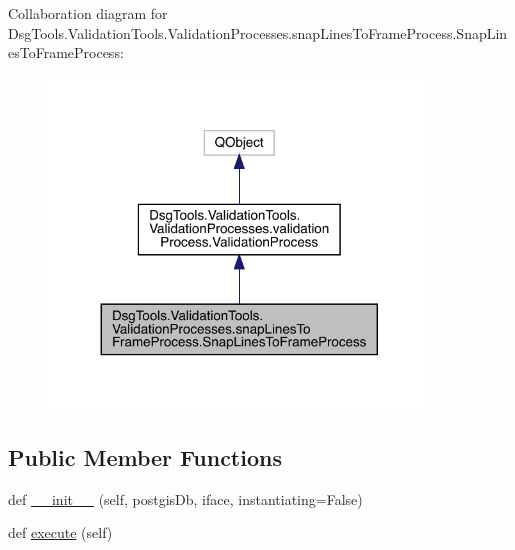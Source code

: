 Collaboration diagram for Dsg\+Tools.\+Validation\+Tools.\+Validation\+Processes.\+snap\+Lines\+To\+Frame\+Process.\+Snap\+Lines\+To\+Frame\+Process\+:
\nopagebreak
\begin{figure}[H]
\begin{center}
\leavevmode
\includegraphics[width=287pt]{class_dsg_tools_1_1_validation_tools_1_1_validation_processes_1_1snap_lines_to_frame_process_1_1ba1654e13ea79a845ddc225e5795362e}
\end{center}
\end{figure}
\subsection*{Public Member Functions}
\begin{DoxyCompactItemize}
\item 
def \mbox{\hyperlink{class_dsg_tools_1_1_validation_tools_1_1_validation_processes_1_1snap_lines_to_frame_process_1_1_snap_lines_to_frame_process_a1c2a11aa0e9f4af689545d552809afcc}{\+\_\+\+\_\+init\+\_\+\+\_\+}} (self, postgis\+Db, iface, instantiating=False)
\item 
def \mbox{\hyperlink{class_dsg_tools_1_1_validation_tools_1_1_validation_processes_1_1snap_lines_to_frame_process_1_1_snap_lines_to_frame_process_af36ad7e2778de6c56e5b6246be685e4f}{execute}} (self)
\end{DoxyCompactItemize}
